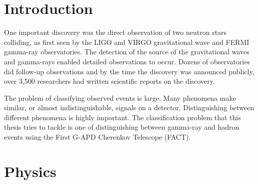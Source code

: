\documentclass[12pt]{article}
\begin{document}

\newpage

\section{Introduction}

One important discovery was the direct observation of two neutron stars colliding, as first seen by the LIGO and VIRGO gravitational wave and FERMI gamma-ray observatories. The detection of the source of the gravitational waves and gamma-rays enabled detailed observations to occur. Dozens of observatories did follow-up observations and by the time the discovery was announced publicly, over 3,500 researchers had written scientific reports on the discovery. 

The problem of classifying observed events is large. Many phenomena make similar, or almost indistinguishable, signals on a detector. Distinguishing between different phenomena is highly important. The classification problem that this thesis tries to tackle is one of distinguishing between gamma-ray and hadron events using the First G-APD Cherenkov Telescope (FACT).

\section{Physics}
\end{document}
